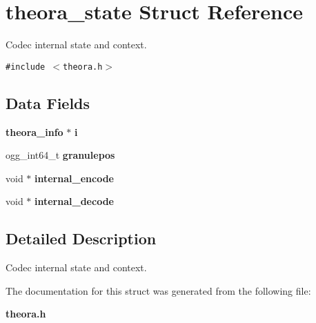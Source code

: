 \section{theora\_\-state Struct Reference}
\label{structtheora__state}
Codec internal state and context.  


{\tt \#include $<$theora.h$>$}

\subsection*{Data Fields}
\begin{CompactItemize}
\item 
{\bf theora\_\-info} $\ast$ {\bf i}\label{structtheora__state_o0}

\item 
ogg\_\-int64\_\-t {\bf granulepos}\label{structtheora__state_o1}

\item 
void $\ast$ {\bf internal\_\-encode}\label{structtheora__state_o2}

\item 
void $\ast$ {\bf internal\_\-decode}\label{structtheora__state_o3}

\end{CompactItemize}


\subsection{Detailed Description}
Codec internal state and context. 



The documentation for this struct was generated from the following file:\begin{CompactItemize}
\item 
{\bf theora.h}\end{CompactItemize}
